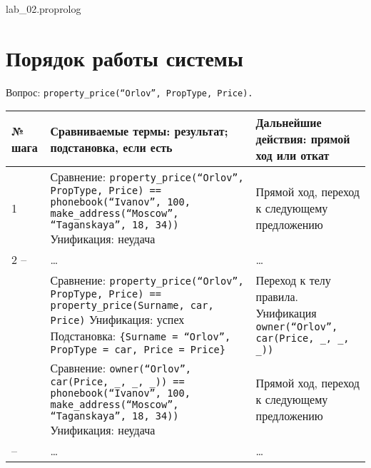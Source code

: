 	{lab_02.pro}{prolog}{}

\clearpage
\section{Порядок работы системы}

Вопрос: \texttt{property\_price(``Orlov'', PropType, Price).}

	\footnotesize
	\begin{xltabular}{\textwidth}{|l|X|Y|}
		\hline
		\textbf{№ шага} &
		\textbf{Сравниваемые термы: результат; подстановка, если есть} &
		\textbf{Дальнейшие действия: прямой ход или откат} \\ \hline
		
		1 & 
		Сравнение:
		\texttt{property\_price(``Orlov'', PropType, Price) == phonebook(``Ivanov'', 100, make\_address(``Moscow'', ``Taganskaya'', 18, 34))} \newline\newline
		Унификация: неудача &
		Прямой ход, переход к следующему предложению \\ \hline
		
		2 --  & \dots & \dots \\ \hline
		
		 &
		Сравнение:
		\texttt{property\_price(``Orlov'', PropType, Price) == property\_price(Surname, car, Price)} \newline\newline
		Унификация: успех \newline\newline
		Подстановка: \texttt{\{Surname = ``Orlov'', PropType = car, Price = Price\}} & 
		Переход к телу правила. \newline\newline
		Унификация\newline
		\texttt{owner(``Orlov'', car(Price, \_, \_, \_))} \\ \hline
		
		 &
		Сравнение:
		\texttt{owner(``Orlov'', car(Price, \_, \_, \_)) == phonebook(``Ivanov'', 100, make\_address(``Moscow'', ``Taganskaya'', 18, 34))} \newline\newline
		Унификация: неудача &
		Прямой ход, переход к следующему предложению \\ \hline
		
		 --  & \dots & \dots \\ \hline
		

\end{xltabular}
